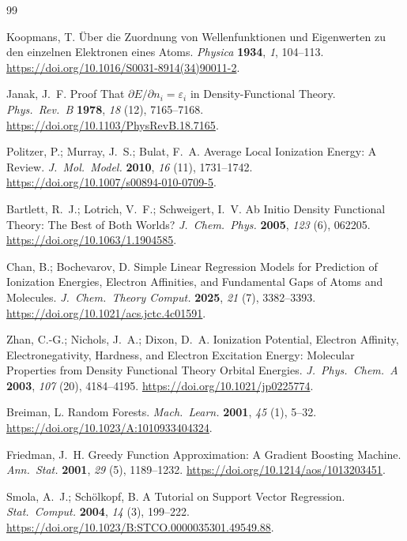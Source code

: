 \clearpage
\begin{thebibliography}{99}

Koopmans, T. \"Uber die Zuordnung von Wellenfunktionen und Eigenwerten zu den einzelnen Elektronen eines Atoms. \emph{Physica} \textbf{1934}, \emph{1}, 104--113. \url{https://doi.org/10.1016/S0031-8914(34)90011-2}.

Janak, J.~F. Proof That $\partial E / \partial n_i = \varepsilon_i$ in Density-Functional Theory. \emph{Phys.~Rev.~B} \textbf{1978}, \emph{18} (12), 7165--7168. \url{https://doi.org/10.1103/PhysRevB.18.7165}.

Politzer, P.; Murray, J.~S.; Bulat, F.~A. Average Local Ionization Energy: A Review. \emph{J.~Mol.~Model.} \textbf{2010}, \emph{16} (11), 1731--1742. \url{https://doi.org/10.1007/s00894-010-0709-5}.

Bartlett, R.~J.; Lotrich, V.~F.; Schweigert, I.~V. Ab Initio Density Functional Theory: The Best of Both Worlds? \emph{J.~Chem.~Phys.} \textbf{2005}, \emph{123} (6), 062205. \url{https://doi.org/10.1063/1.1904585}.

Chan, B.; Bochevarov, D. Simple Linear Regression Models for Prediction of Ionization Energies, Electron Affinities, and Fundamental Gaps of Atoms and Molecules. \emph{J.~Chem.~Theory Comput.} \textbf{2025}, \emph{21} (7), 3382--3393. \url{https://doi.org/10.1021/acs.jctc.4c01591}.

Zhan, C.-G.; Nichols, J.~A.; Dixon, D.~A. Ionization Potential, Electron Affinity, Electronegativity, Hardness, and Electron Excitation Energy: Molecular Properties from Density Functional Theory Orbital Energies. \emph{J.~Phys.~Chem.~A} \textbf{2003}, \emph{107} (20), 4184--4195. \url{https://doi.org/10.1021/jp0225774}.

Breiman, L. Random Forests. \emph{Mach.~Learn.} \textbf{2001}, \emph{45} (1), 5--32. \url{https://doi.org/10.1023/A:1010933404324}.

Friedman, J.~H. Greedy Function Approximation: A Gradient Boosting Machine. \emph{Ann.~Stat.} \textbf{2001}, \emph{29} (5), 1189--1232. \url{https://doi.org/10.1214/aos/1013203451}.

Smola, A.~J.; Schölkopf, B. A Tutorial on Support Vector Regression. \emph{Stat.~Comput.} \textbf{2004}, \emph{14} (3), 199--222. \url{https://doi.org/10.1023/B:STCO.0000035301.49549.88}.


\end{thebibliography}
